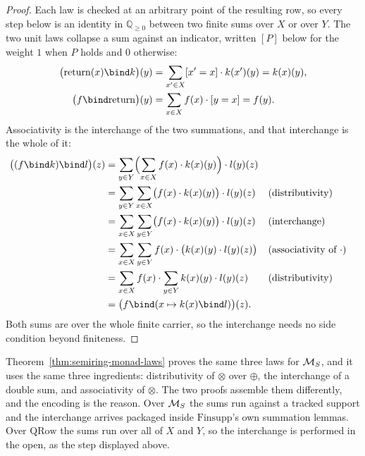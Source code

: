 \begin{proof}
\leanok
Each law is checked at an arbitrary point of the resulting row, so
every step below is an identity in $\mathbb Q_{\ge 0}$ between two
finite sums over $X$ or over $Y$. The two unit laws collapse a sum
against an indicator, written $[P]$ below for the weight $1$ when $P$
holds and $0$ otherwise:
\begin{align*}
  \bigl(\Ret(x) \bind k\bigr)(y)
    &= \sum_{x' \in X} [x' = x] \cdot k(x')(y) = k(x)(y), \\
  \bigl(f \bind \Ret\bigr)(y)
    &= \sum_{x \in X} f(x) \cdot [y = x] = f(y).
\end{align*}
Associativity is the interchange of the two summations, and that
interchange is the whole of it:
\begin{align*}
  \bigl((f \bind k) \bind l\bigr)(z)
    &= \sum_{y \in Y} \Bigl(\sum_{x \in X} f(x) \cdot k(x)(y)\Bigr)
       \cdot l(y)(z) \\
    &= \sum_{y \in Y} \sum_{x \in X}
       \bigl(f(x) \cdot k(x)(y)\bigr) \cdot l(y)(z)
       && \text{(distributivity)} \\
    &= \sum_{x \in X} \sum_{y \in Y}
       \bigl(f(x) \cdot k(x)(y)\bigr) \cdot l(y)(z)
       && \text{(interchange)} \\
    &= \sum_{x \in X} \sum_{y \in Y}
       f(x) \cdot \bigl(k(x)(y) \cdot l(y)(z)\bigr)
       && \text{(associativity of $\cdot$)} \\
    &= \sum_{x \in X} f(x) \cdot
       \sum_{y \in Y} k(x)(y) \cdot l(y)(z)
       && \text{(distributivity)} \\
    &= \bigl(f \bind (x \mapsto k(x) \bind l)\bigr)(z).
\end{align*}
Both sums are over the whole finite carrier, so the interchange needs
no side condition beyond finiteness.
\end{proof}

Theorem~\ref{thm:semiring-monad-laws} proves the same three laws for
$\mathcal M_{S}$, and it uses the same three ingredients: distributivity of
$\otimes$ over $\oplus$, the interchange of a double sum, and
associativity of $\otimes$. The two proofs assemble them differently,
and the encoding is the reason. Over $\mathcal M_{S}$ the sums run against a
tracked support and the interchange arrives packaged inside
$\mathrm{Finsupp}$'s own summation lemmas. Over $\mathrm{QRow}$ the
sums run over all of $X$ and $Y$, so the interchange is performed in
the open, as the step displayed above.

